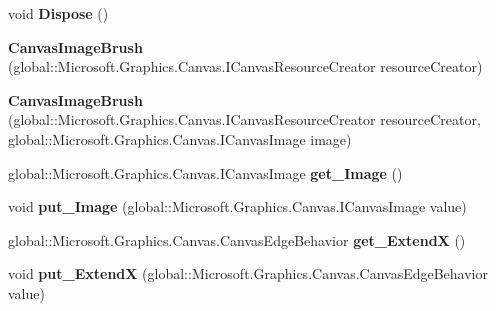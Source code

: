\begin{DoxyCompactItemize}
void {\bfseries Dispose} ()
\item 
\mbox{\label{class_microsoft_1_1_graphics_1_1_canvas_1_1_brushes_1_1_canvas_image_brush_adbb56b8d19fbd4dfd899d515aba49f92}} 
{\bfseries Canvas\+Image\+Brush} (global\+::\+Microsoft.\+Graphics.\+Canvas.\+I\+Canvas\+Resource\+Creator resource\+Creator)
\item 
\mbox{\label{class_microsoft_1_1_graphics_1_1_canvas_1_1_brushes_1_1_canvas_image_brush_aeb29fd1437d8ae16d2fe8546010eb7db}} 
{\bfseries Canvas\+Image\+Brush} (global\+::\+Microsoft.\+Graphics.\+Canvas.\+I\+Canvas\+Resource\+Creator resource\+Creator, global\+::\+Microsoft.\+Graphics.\+Canvas.\+I\+Canvas\+Image image)
\item 
\mbox{\label{class_microsoft_1_1_graphics_1_1_canvas_1_1_brushes_1_1_canvas_image_brush_acd493d96591a7820f9e9bada709041ad}} 
global\+::\+Microsoft.\+Graphics.\+Canvas.\+I\+Canvas\+Image {\bfseries get\+\_\+\+Image} ()
\item 
\mbox{\label{class_microsoft_1_1_graphics_1_1_canvas_1_1_brushes_1_1_canvas_image_brush_af68d570f7be103d2a799285c816315c9}} 
void {\bfseries put\+\_\+\+Image} (global\+::\+Microsoft.\+Graphics.\+Canvas.\+I\+Canvas\+Image value)
\item 
\mbox{\label{class_microsoft_1_1_graphics_1_1_canvas_1_1_brushes_1_1_canvas_image_brush_ab8eedf6b67df8a2df6174d213c8ff556}} 
global\+::\+Microsoft.\+Graphics.\+Canvas.\+Canvas\+Edge\+Behavior {\bfseries get\+\_\+\+ExtendX} ()
\item 
\mbox{\label{class_microsoft_1_1_graphics_1_1_canvas_1_1_brushes_1_1_canvas_image_brush_aca638fc134d4d7aeb045f7af68be64d4}} 
void {\bfseries put\+\_\+\+ExtendX} (global\+::\+Microsoft.\+Graphics.\+Canvas.\+Canvas\+Edge\+Behavior value)
\item 
\mbox{\label{class_microsoft_1_1_graphics_1_1_canvas_1_1_brushes_1_1_canvas_image_brush_a6d17dd87d557c5dd892bcd91ed6d580c}} 

\end{DoxyCompactItemize}
